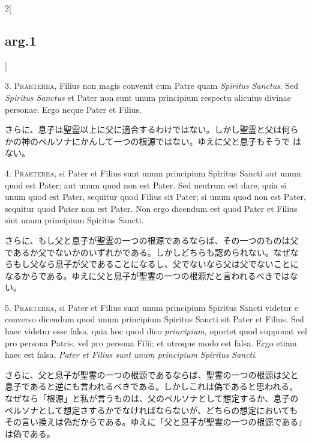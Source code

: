 \documentclass[paper=a4paper,fontsize=10pt,jafontsize=9pt,titlepage]{jlreq}
\begin{document}
\begin{paracol}{2}[\subsection{arg.1}]

3. {\scshape Praeterea}, Filius non magis convenit cum Patre quam {\itshape
Spiritus Sanctus}. Sed {\itshape  Spiritus Sanctus} et Pater non sunt
unum principium respectu alicuius divinae personae. Ergo neque Pater
et Filius.

\switchcolumn

さらに、息子は聖霊以上に父に適合するわけではない。しかし聖霊と父は何ら
 かの神のペルソナにかんして一つの根源ではない。ゆえに父と息子もそうで
 はない。


4. {\scshape Praeterea}, si Pater et Filius sunt unum principium  Spiritus Sancti
aut unum quod est Pater; aut unum quod non est Pater. Sed neutrum est
dare, quia si unum quod est Pater, sequitur quod Filius sit Pater; si
unum quod non est Pater, sequitur quod Pater non est Pater. Non ergo
dicendum est quod Pater et Filius sint unum principium  Spiritus
Sancti.

\switchcolumn

さらに、もし父と息子が聖霊の一つの根源であるならば、その一つのものは父
であるか父でないかのいずれかである。しかしどちらも認められない。なぜな
らもし父なら息子が父であることになるし、父でないなら父は父でないことに
なるからである。ゆえに父と息子が聖霊の一つの根源だと言われるべきではな
い。


5. {\scshape Praeterea}, si Pater et Filius sunt unum principium  Spiritus Sancti
videtur e converso dicendum quod unum principium  Spiritus Sancti sit
Pater et Filius. Sed haec videtur esse falsa, quia hoc quod dico
{\itshape principium}, oportet quod supponat vel pro persona Patris, vel pro
persona Filii; et utroque modo est falsa. Ergo etiam haec est falsa,
{\itshape Pater et Filius sunt unum principium  Spiritus Sancti}.

\switchcolumn

さらに、父と息子が聖霊の一つの根源であるならば、聖霊の一つの根源は父と
息子であると逆にも言われるべきである。しかしこれは偽であると思われる。
なぜなら「根源」と私が言うものは、父のペルソナとして想定するか、息子の
ペルソナとして想定さするかでなければならないが、どちらの想定においても
その言い換えは偽だからである。ゆえに「父と息子が聖霊の一つの根源である」
は偽である。


\end{paracol}
\end{document}
